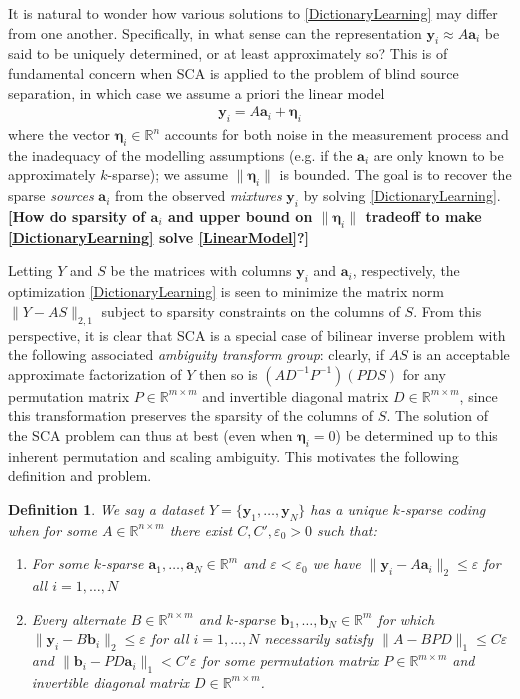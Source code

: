 \documentclass[journal, onecolumn]{IEEEtran}
\newtheorem{definition}{Definition}
\begin{document}
It is natural to wonder how various solutions to \eqref{DictionaryLearning} may differ from one another. Specifically, in what sense can the representation $\mathbf{y}_i \approx A\mathbf{a}_i$ be said to be uniquely determined, or at least approximately so? This is of fundamental concern when SCA is applied to the problem of blind source separation, in which case we assume a priori the linear model
\begin{align}\label{LinearModel}
\mathbf{y}_i = A\mathbf{a}_i + \mathbf{\eta}_i 
\end{align}
%
where the vector $\mathbf{\eta}_i \in \mathbb{R}^n$ accounts for both noise in the measurement process and the inadequacy of the modelling assumptions (e.g. if the $\mathbf{a}_i$ are only known to be approximately $k$-sparse); we assume $\|\mathbf{\eta}_i\|$ is bounded. The goal is to recover the sparse \emph{sources} $\mathbf{a}_i$ from the observed \emph{mixtures} $\mathbf{y}_i$ by solving \eqref{DictionaryLearning}. \textbf{[How do sparsity of $\mathbf{a}_i$ and upper bound on $\|\mathbf{\eta}_i\|$ tradeoff to make \eqref{DictionaryLearning} solve \eqref{LinearModel}?]}


Letting $Y$ and $S$ be the matrices with columns $\mathbf{y}_i$ and $\mathbf{a}_i$, respectively, the optimization \eqref{DictionaryLearning} is seen to minimize the matrix norm $\|Y-AS\|_{2,1}$ subject to sparsity constraints on the columns of $S$. From this perspective, it is clear that SCA is a special case of bilinear inverse problem with the following associated \emph{ambiguity transform group}: clearly, if $AS$ is an acceptable approximate factorization of $Y$ then so is $(AD^{-1}P^{-1})(PDS)$ for any permutation matrix $P \in \mathbb{R}^{m \times m}$ and invertible diagonal matrix $D \in \mathbb{R}^{m \times m}$, since this transformation preserves the sparsity of the columns of $S$. The solution of the SCA problem can thus at best (even when $\mathbf{\eta}_i = 0$) be determined up to this inherent permutation and scaling ambiguity. This motivates the following definition and problem.

\begin{definition}\label{Uniqueness}
We say a dataset $Y = \{\mathbf{y}_1, \ldots, \mathbf{y}_N\}$ has a unique $k$-sparse coding when for some $A \in \mathbb{R}^{n \times m}$ there exist $C, C', \varepsilon_0 > 0$ such that:
\begin{enumerate}
\item For some $k$-sparse $\mathbf{a}_1, \ldots, \mathbf{a}_N \in \mathbb{R}^m$ and $\varepsilon < \varepsilon_0$ we have $\|\mathbf{y}_i - A\mathbf{a}_i\|_2 \leq \varepsilon$ for all $i = 1, \ldots, N$
\item Every alternate $B \in \mathbb{R}^{n \times m}$ and $k$-sparse $\mathbf{b}_1, \ldots, \mathbf{b}_N \in \mathbb{R}^m$ for which $\|\mathbf{y}_i - B\mathbf{b}_i\|_2 \leq \varepsilon$ for all $i = 1, \ldots, N$ necessarily satisfy $\|A - BPD\|_1 \leq C\varepsilon$ and $\|\mathbf{b}_i - PD\mathbf{a}_i\|_1 < C'\varepsilon$ for some permutation matrix $P \in \mathbb{R}^{m \times m}$ and invertible diagonal matrix $D \in \mathbb{R}^{m \times m}$.
\end{enumerate}
\end{definition}
\end{document}
